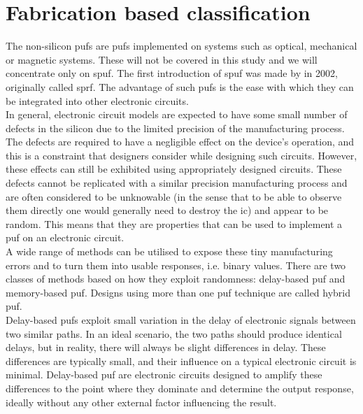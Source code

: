 \section{Fabrication based classification}


The non-silicon \acrshort{puf}s are \acrshort{puf}s implemented on systems such as optical, mechanical or magnetic systems. These will not be covered in this study and we will concentrate only on \acrfull{spuf}. The first introduction of \acrshort{spuf} was made by \cite{gassend_silicon_2002} in 2002, originally called \acrfull{sprf}. The advantage of such \acrshort{puf}s is the ease with which they can be integrated into other electronic circuits.\\

In general, electronic circuit models are expected to have some small number of defects in the silicon due to the limited precision of the manufacturing process. The defects are required to have a negligible effect on the device's operation, and this is a constraint that designers consider while designing such circuits. However, these effects can still be exhibited using appropriately designed circuits. These defects cannot be replicated with a similar precision manufacturing process and are often considered to be unknowable (in the sense that to be able to observe them directly one would generally need to destroy the \acrfull{ic}) and appear to be random. This means that they are properties that can be used to implement a \acrshort{puf} on an electronic circuit.\\

A wide range of methods can be utilised to expose these tiny manufacturing errors and to turn them into usable responses, i.e. binary values. There are two classes of methods based on how they exploit randomness: delay-based \acrshort{puf} and memory-based \acrshort{puf}. Designs using more than one \acrshort{puf} technique are called hybrid \acrshort{puf}.\\

Delay-based \acrshort{puf}s exploit small variation in the delay of electronic signals between two similar paths. In an ideal scenario, the two paths should produce identical delays, but in reality, there will always be slight differences in delay. These differences are typically small, and their influence on a typical electronic circuit is minimal. Delay-based \acrshort{puf} are electronic circuits designed to amplify these differences to the point where they dominate and determine the output response, ideally without any other external factor influencing the result.\\

